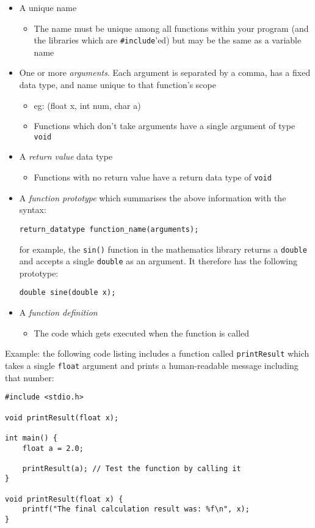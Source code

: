 \documentclass{lab}
\begin{document}
\begin{itemize}
	\item A unique name
		\begin{itemize}
			\item The name must be unique among all functions within your program (and the libraries which are \texttt{\#include}'ed) but may be the same as a variable name
		\end{itemize}
	\item One or more \textit{arguments}. Each argument is separated by a comma, has a fixed data type, and name unique to that function's scope
		\begin{itemize}
			\item eg: (float x, int num, char a)
			\item Functions which don't take arguments have a single argument of type \texttt{void}
		\end{itemize}
	\item A \textit{return value} data type
		\begin{itemize}
			\item Functions with no return value have a return data type of \texttt{void}
		\end{itemize}
	\item A \textit{function prototype} which summarises the above information with the syntax:
\begin{lstlisting}[style=CStyle]
return_datatype function_name(arguments);
\end{lstlisting}
for example, the \texttt{sin()} function in the mathematics library returns a \texttt{double} and accepts a single \texttt{double} as an argument. It therefore has the following prototype:
\begin{lstlisting}[style=CStyle]
double sine(double x);
\end{lstlisting}
		\item A \textit{function definition}
		\begin{itemize}
			\item The code which gets executed when the function is called
		\end{itemize}
\end{itemize}

Example: the following code listing includes a function called \texttt{printResult} which takes a single \texttt{float} argument and prints a human-readable message including that number:

\begin{lstlisting}[style=CStyle]
#include <stdio.h>

void printResult(float x);

int main() {
	float a = 2.0;
	
	printResult(a); // Test the function by calling it
}

void printResult(float x) {
	printf("The final calculation result was: %f\n", x);
}
\end{lstlisting}
\end{document}
